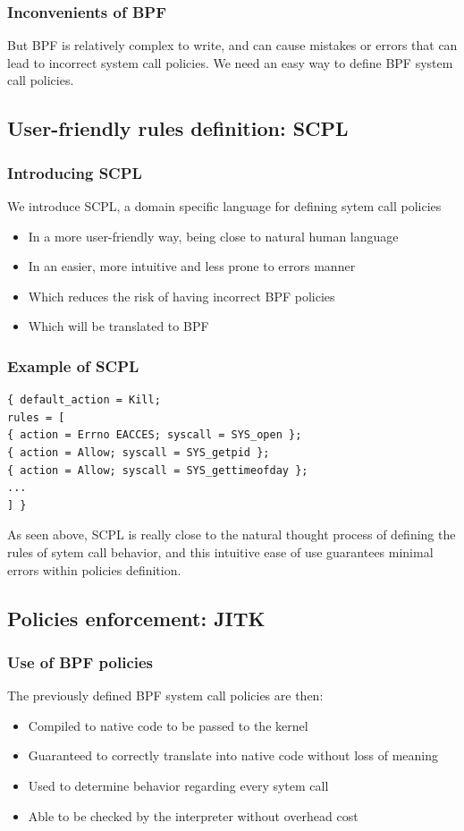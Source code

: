 \documentclass{beamer}
\begin{document}
\begin{frame}\frametitle{Inconvenients of BPF}
But BPF is relatively complex to write, and can cause mistakes or errors that can lead to incorrect system call policies.
\pause
We need an easy way to define BPF system call policies.
\end{frame}

\subsection{User-friendly rules definition: SCPL}

\begin{frame}\frametitle{Introducing SCPL}
We introduce SCPL, a domain specific language for defining sytem call policies
\begin{itemize}[<+->]
	\item In a more user-friendly way, being close to natural human language
	\item In an easier, more intuitive and less prone to errors manner
	\item Which reduces the risk of having incorrect BPF policies
	\item Which will be translated to BPF
 \end{itemize}
\end{frame}

\begin{frame}[fragile]\frametitle{Example of SCPL}
\begin{verbatim}
{ default_action = Kill;
rules = [
{ action = Errno EACCES; syscall = SYS_open };
{ action = Allow; syscall = SYS_getpid };
{ action = Allow; syscall = SYS_gettimeofday };
...
] }
\end{verbatim}
\pause
As seen above, SCPL is really close to the natural thought process of defining the rules of sytem call behavior, and this intuitive ease of use guarantees minimal errors within policies definition.
\end{frame}

\subsection{Policies enforcement: JITK}
\begin{frame}\frametitle{Use of BPF policies}
The previously defined BPF system call policies are then:
\begin{itemize}[<+->]
	\item Compiled to native code to be passed to the kernel
	\item Guaranteed to correctly translate into native code without loss of meaning
	\item Used to determine behavior regarding every sytem call
	\item Able to be checked by the interpreter without overhead cost
 \end{itemize}
\end{frame}
\end{document}
